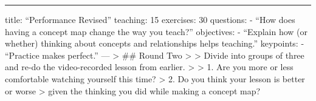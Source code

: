 \begin{center}
\rule{3in}{0.4pt}
\end{center}
title: ``Performance Revised''
teaching: 15
exercises: 30
questions:
- ``How does having a concept map change the way you teach?''
objectives:
- ``Explain how (or whether) thinking about concepts and relationships helps teaching.''
keypoints:
- ``Practice makes perfect.''
---
\textgreater{} \#\# Round Two
\textgreater{}
\textgreater{} Divide into groups of three and re-do the video-recorded lesson from earlier.
\textgreater{}
\textgreater{} 1. Are you more or less comfortable watching yourself this time?
\textgreater{} 2. Do you think your lesson is better or worse
\textgreater{}    given the thinking you did while making a concept map?

